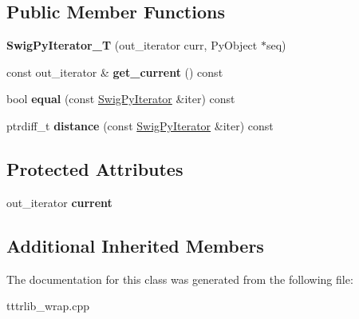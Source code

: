 \subsection*{Public Member Functions}
\begin{DoxyCompactItemize}
\item 
\mbox{\label{classswig_1_1_swig_py_iterator___t_aed627e359856103f6e9b2e939fc85d9c}} 
{\bfseries Swig\+Py\+Iterator\+\_\+T} (out\+\_\+iterator curr, Py\+Object $\ast$seq)
\item 
\mbox{\label{classswig_1_1_swig_py_iterator___t_a5079275c680963f14ba496ebd4f07c7b}} 
const out\+\_\+iterator \& {\bfseries get\+\_\+current} () const
\item 
\mbox{\label{classswig_1_1_swig_py_iterator___t_a14f2ba114f370932df0bf1ab06d0a5e2}} 
bool {\bfseries equal} (const \hyperlink{structswig_1_1_swig_py_iterator}{Swig\+Py\+Iterator} \&iter) const
\item 
\mbox{\label{classswig_1_1_swig_py_iterator___t_ab98b853b7da59239d8b260be34dbda26}} 
ptrdiff\+\_\+t {\bfseries distance} (const \hyperlink{structswig_1_1_swig_py_iterator}{Swig\+Py\+Iterator} \&iter) const
\end{DoxyCompactItemize}
\subsection*{Protected Attributes}
\begin{DoxyCompactItemize}
\item 
\mbox{\label{classswig_1_1_swig_py_iterator___t_a7b69908f19b9150a4d2b357567f8bd82}} 
out\+\_\+iterator {\bfseries current}
\end{DoxyCompactItemize}
\subsection*{Additional Inherited Members}


The documentation for this class was generated from the following file\+:\begin{DoxyCompactItemize}
\item 
tttrlib\+\_\+wrap.\+cpp\end{DoxyCompactItemize}
